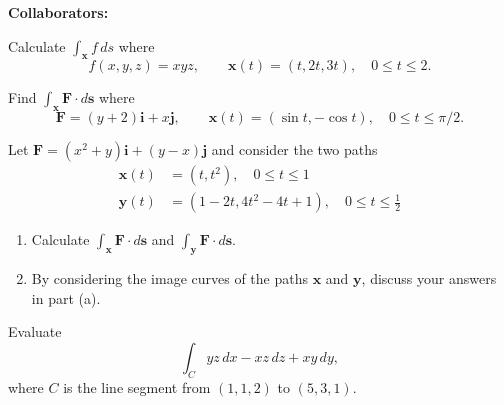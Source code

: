 \documentclass[11pt,letterpaper,boxed]{hmcpset}
\begin{document}
\noindent\textbf{Collaborators:} 


\begin{problem}[Colley 6.1 \#2]
Calculate $\int_{\mathbf{x}} f\,ds$ where
\[
	f(x,y,z) = xyz, \qquad \mathbf{x}(t) = (t,2t,3t), \quad 0\leq t\leq2.
\]
\end{problem}

\begin{solution}
\vfill
\end{solution}
\newpage

\begin{problem}[Colley 6.1 \#9]
Find $\int_{\mathbf{x}}\mathbf{F}\cdot d\mathbf{s}$ where
\[
	\mathbf{F} = (y+2)\mathbf{i}+x\mathbf{j}, \qquad \mathbf{x}(t) = (\sin{t},-\cos{t}), \quad 0\leq t\leq\pi/2.
\]
\end{problem}

\begin{solution}
\vfill
\end{solution}
\newpage

\begin{problem}[Colley 6.1 \#21]
Let $\mathbf{F} = (x^2+y)\mathbf{i}+(y-x)\mathbf{j}$ and consider the two paths
\begin{align*}
	\mathbf{x}(t) &= (t,t^2), \quad 0\leq t \leq 1\\
	\mathbf{y}(t) &= (1-2t, 4t^2-4t+1), \quad 0\leq t\leq \frac{1}{2}
\end{align*}
\begin{enumerate}
\item Calculate $\int_{\mathbf{x}}\mathbf{F}\cdot d\mathbf{s}$ and $\int_{\mathbf{y}}\mathbf{F}\cdot d\mathbf{s}$.
\item By considering the image curves of the paths $\mathbf{x}$ and $\mathbf{y}$, discuss your answers in part (a).
\end{enumerate}
\end{problem}

\begin{solution}
\vfill
\end{solution}
\newpage

\begin{problem}[Colley 6.1 \#31]
Evaluate
\[
	\int_Cyz\,dx -xz\,dz+xy\,dy,
\]
where $C$ is the line segment from $(1,1,2)$ to $(5,3,1)$.
\end{problem}

\begin{solution}
\vfill
\end{solution}
\newpage
\end{document}
